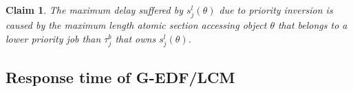 \documentclass[conference]{sig-alternate}
\newtheorem{clm}{Claim}
\begin{document}
\begin{clm}
\label{max_pri_inv}
The maximum delay suffered by $s_j^l(\theta)$ due to priority inversion is caused by the maximum length atomic section accessing object $\theta$ that belongs to a lower priority job than $\tau_j^b$ that owns $s_j^l(\theta)$.
\end{clm}

\subsection{\label{response g-edf/lcm} Response time of G-EDF/LCM}
\end{document}
